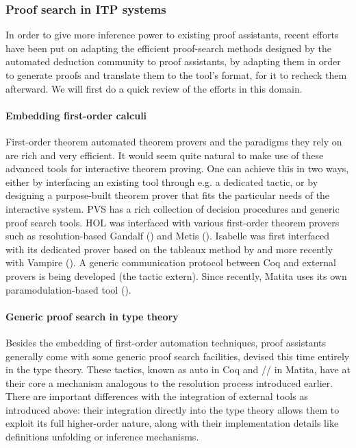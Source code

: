 \documentclass[twoside,a4paper,12pt]{article}
\begin{document}
\subsubsection{Proof search in ITP systems}

In order to give more inference power to existing proof assistants,
recent efforts have been put on adapting the efficient proof-search
methods designed by the automated deduction community to proof
assistants, by adapting them in order to generate proofs and translate
them to the tool's format, for it to recheck them afterward. We will
first do a quick review of the efforts in this domain.

\paragraph{Embedding first-order calculi}

First-order theorem automated theorem provers and the paradigms they
rely on are rich and very efficient. It would seem quite natural to
make use of these advanced tools for interactive theorem proving. One
can achieve this in two ways, either by interfacing an existing tool
through e.g. a dedicated tactic, or by designing a purpose-built
theorem prover that fits the particular needs of the interactive
system. \textsf{PVS} has a rich collection of decision procedures and
generic proof search tools. \textsf{HOL} was interfaced with various
first-order theorem provers such as resolution-based \textsf{Gandalf}
(\cite{hurd1999integrating}) and \textsf{Metis}
(\cite{hurd2003first}). \textsf{Isabelle} was first interfaced with
its dedicated prover based on the tableaux method by \cite{paulson99}
and more recently with \textsf{Vampire} (\cite{meng2006automation}). A
generic communication protocol between \textsf{Coq} and external
provers is being developed (the tactic \textsf{extern}). Since
recently, \textsf{Matita} uses its own paramodulation-based tool
(\cite{asperti2010paramodulation}).

\paragraph{Generic proof search in type theory}

Besides the embedding of first-order automation techniques, proof
assistants generally come with some generic proof search facilities,
devised this time entirely in the type theory. These tactics, known as
\textsf{auto} in \textsf{Coq} and \textsf{//} in \textsf{Matita}, have
at their core a mechanism analogous to the resolution process
introduced earlier. There are important differences with the
integration of external tools as introduced above: their integration
directly into the type theory allows them to exploit its full
higher-order nature, along with their implementation details like
definitions unfolding or inference mechanisms.
\end{document}
